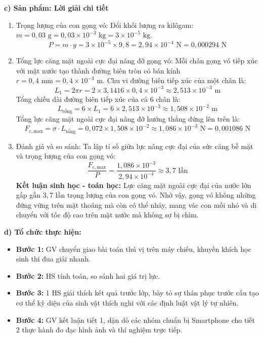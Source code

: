 \documentclass[12pt, a4paper]{article}
\begin{document}
\noindent \textbf{c) Sản phẩm: Lời giải chi tiết}
\begin{enumerate}
    \item Trọng lượng của con gọng vó:
    Đổi khối lượng ra kilôgam: $m = 0{,}03\text{ g} = 0{,}03 \times 10^{-3}\text{ kg} = 3 \times 10^{-5}\text{ kg}$.
    $$P = m \cdot g = 3 \times 10^{-5} \times 9{,}8 = 2{,}94 \times 10^{-4}\text{ N} = 0{,}000294\text{ N}$$
    \item Tổng lực căng mặt ngoài cực đại nâng đỡ gọng vó:
    Mỗi chân gọng vó tiếp xúc với mặt nước tạo thành đường biên tròn có bán kính $r = 0{,}4\text{ mm} = 0{,}4 \times 10^{-3}\text{ m}$.
    Chu vi đường biên tiếp xúc của một chân là:
    $$L_1 = 2\pi r = 2 \times 3{,}1416 \times 0{,}4 \times 10^{-3} \approx 2{,}513 \times 10^{-3}\text{ m}$$
    Tổng chiều dài đường biên tiếp xúc của cả 6 chân là:
    $$L_{\text{tổng}} = 6 \times L_1 = 6 \times 2{,}513 \times 10^{-3} \approx 1{,}508 \times 10^{-2}\text{ m}$$
    Tổng lực căng mặt ngoài cực đại nâng đỡ hướng thẳng đứng lên trên là:
    $$F_{c,\text{max}} = \sigma \cdot L_{\text{tổng}} = 0{,}072 \times 1{,}508 \times 10^{-2} \approx 1{,}086 \times 10^{-3}\text{ N} = 0{,}001086\text{ N}$$
    \item Đánh giá và so sánh:
    Ta lập tỉ số giữa lực nâng cực đại của sức căng bề mặt và trọng lượng của con gọng vó:
    $$\dfrac{F_{c,\text{max}}}{P} = \dfrac{1{,}086 \times 10^{-3}}{2{,}94 \times 10^{-4}} \approx 3{,}7\text{ lần}$$
    \textbf{Kết luận sinh học - toán học:} Lực căng mặt ngoài cực đại của nước lớn gấp gần $3{,}7$ lần trọng lượng của con gọng vó. Nhờ vậy, gọng vó không những đứng vững trên mặt thoáng mà còn có thể nhảy, mang vác con mồi nhỏ và di chuyển với tốc độ cao trên mặt nước mà không sợ bị chìm.
\end{enumerate}

\noindent \textbf{d) Tổ chức thực hiện:}
\begin{itemize}
    \item \textbf{Bước 1:} GV chuyển giao bài toán thú vị trên máy chiếu, khuyến khích học sinh thi đua giải nhanh.
    \item \textbf{Bước 2:} HS tính toán, so sánh hai giá trị lực.
    \item \textbf{Bước 3:} 1 HS giải thích kết quả trước lớp, bày tỏ sự thán phục trước cấu tạo cơ thể kỳ diệu của sinh vật thích nghi với các định luật vật lý tự nhiên.
    \item \textbf{Bước 4:} GV kết luận tiết 1, dặn dò các nhóm chuẩn bị Smartphone cho tiết 2 thực hành đo đạc hình ảnh và thí nghiệm trực tiếp.
\end{itemize}
\end{document}
